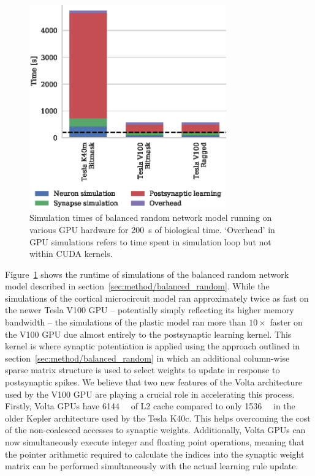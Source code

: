 \documentclass[utf8]{frontiersSCNS} %
\begin{document}
\begin{figure}
    \begin{center}
        \includegraphics[width=85mm]{figures/stdp_performance}
    \end{center}
    \caption{Simulation times of balanced random network model running on various GPU hardware for \SI{200}{\second} of biological time.
    `Overhead' in GPU simulations refers to time spent in simulation loop but not within CUDA kernels.}
    \label{fig:stdp_performance}
\end{figure}

Figure~\ref{fig:stdp_performance} shows the runtime of simulations of the balanced random network model described in section~\ref{sec:method/balanced_random}.
While the simulations of the cortical microcircuit model ran approximately twice as fast on the newer Tesla V100 GPU -- potentially simply reflecting its higher memory bandwidth -- the simulations of the plastic model ran more than $10\times$ faster on the V100 GPU due almost entirely to the postsynaptic learning kernel.
This kernel is where synaptic potentiation is applied using the approach outlined in section~\ref{sec:method/balanced_random} in which an additional column-wise sparse matrix structure is used to select weights to update in response to postsynaptic spikes.
We believe that two new features of the Volta architecture~\citep{Nvidia2017} used by the V100 GPU are playing a crucial role in accelerating this process.
Firstly, Volta GPUs have \SI{6144}{\kibi\byte} of L2 cache compared to only \SI{1536}{\kibi\byte} in the older Kepler architecture used by the Tesla K40c.
This helps overcoming the cost of the non-coalesced accesses to synaptic weights.
Additionally, Volta GPUs can now simultaneously execute integer and floating point operations, meaning that the pointer arithmetic required to calculate the indices into the synaptic weight matrix can be performed simultaneously with the actual learning rule update.
\end{document}
